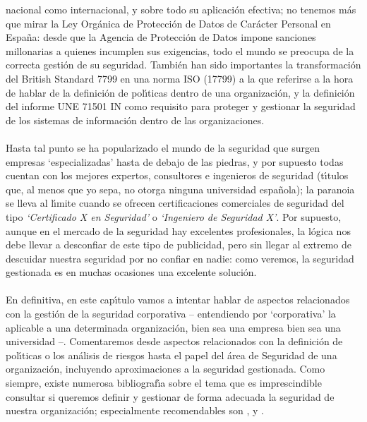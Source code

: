 nacional como internacional, y sobre todo su aplicaci\'on efectiva; no tenemos
m\'as que mirar la Ley Org\'anica de Protecci\'on de Datos de Car\'acter
Personal en Espa\~na: desde que la Agencia de Protecci\'on de Datos impone
sanciones millonarias a quienes incumplen sus exigencias, todo el mundo se
preocupa de la correcta gesti\'on de su seguridad. Tambi\'en han sido 
importantes la transformaci\'on del British Standard 7799 en una norma ISO 
(17799) a la que referirse a la hora de hablar de la definici\'on de 
pol\'{\i}ticas dentro de una organizaci\'on, y la definici\'on del informe 
UNE 71501 IN como requisito para proteger y gestionar la seguridad de los
sistemas de informaci\'on dentro de las organizaciones.\\
\\Hasta tal punto se ha popularizado el mundo de la seguridad que surgen 
empresas `especializadas' hasta de debajo de las piedras, y por supuesto todas
cuentan con los mejores expertos, consultores e ingenieros de seguridad 
(t\'{\i}tulos que, al menos que yo sepa, no otorga ninguna universidad
espa\~nola); la paranoia se lleva al l\'{\i}mite cuando se ofrecen 
certificaciones comerciales de seguridad del tipo {\it `Certificado X en 
Seguridad'} o {\it `Ingeniero de Seguridad X'}. Por supuesto, aunque en el 
mercado de la seguridad hay excelentes profesionales, la l\'ogica nos debe 
llevar a desconfiar de este tipo de publicidad, pero sin llegar al extremo de 
descuidar nuestra seguridad por no confiar en nadie: como veremos, la seguridad 
gestionada es en muchas ocasiones una excelente soluci\'on.\\
\\En definitiva, en este cap\'{\i}tulo vamos a intentar hablar de aspectos
relacionados con la gesti\'on de la seguridad corporativa -- entendiendo por
`corporativa' la aplicable a una determinada organizaci\'on, bien sea una
empresa bien sea una universidad --. Comentaremos desde aspectos relacionados
con la definici\'on de pol\'{\i}ticas o los an\'alisis de riesgos hasta el
papel del \'area de Seguridad de una organizaci\'on, incluyendo aproximaciones
a la seguridad gestionada. Como siempre, existe numerosa bibliograf\'{\i}a sobre
el tema que es imprescindible consultar si queremos definir y gestionar 
de forma adecuada la seguridad de nuestra organizaci\'on; especialmente 
recomendables son \cite{kn:iso}, \cite{kn:oss} y \cite{kn:nist97}.

